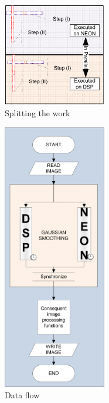\begin{figure}
\includegraphics[width=0.4\textwidth]{drawings/gaussian_balancing}
\caption{Splitting the work}
\label{fig:balancing}
\end{figure}

\begin{figure}
\includegraphics[width=0.4\textwidth]{drawings/model}
\caption{Data flow}
\label{fig:dataflow}
\end{figure}



